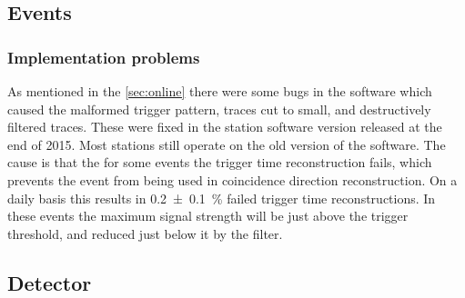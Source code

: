 \subsection{Events}

\subsubsection{Implementation problems}

As mentioned in the \cref{sec:online} there were some bugs in the software which caused the malformed trigger pattern, traces cut to small, and destructively filtered traces. These were fixed in the \hisparc station software version released at the end of 2015. Most stations still operate on the old version of the software. The cause is that the for some events the trigger time reconstruction fails, which prevents the event from being used in coincidence direction reconstruction. On a daily basis this results in \SI{0.2 \pm 0.1}{\percent} failed trigger time reconstructions. In these events the maximum signal strength will be just above the trigger threshold, and reduced just below it by the filter.


\subsection{Detector}
